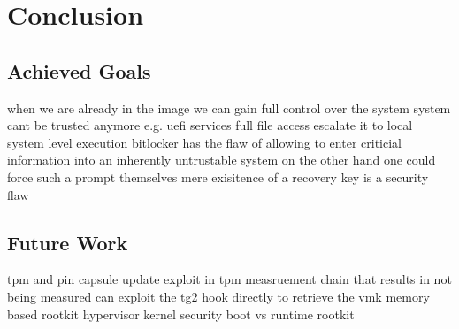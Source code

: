 
\chapter{Conclusion}


\section{Achieved Goals}
when we are already in the image we can gain full control over the system
system cant be trusted anymore e.g. uefi services
full file access
escalate it to local system level execution
bitlocker has the flaw of allowing to enter criticial information into an inherently untrustable system
on the other hand one could force such a prompt themselves
mere exisitence of a recovery key is a security flaw

\section{Future Work}
tpm and pin
capsule update
exploit in tpm measruement chain that results in not being measured
can exploit the tg2 hook directly to retrieve the vmk
memory based rootkit
hypervisor kernel security
boot vs runtime rootkit